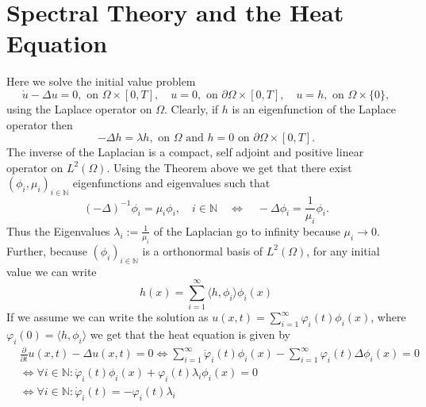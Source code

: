 \documentclass[A4,12pt,twoside]{book}
\begin{document}
\section{Spectral Theory and the Heat Equation}
Here we solve the initial value problem 
\[
\dot{u} - \Delta u =0, \text{ on } \Omega \times [0,T], \quad u=0, \text{ on } \partial \Omega \times [0,T], \quad u=h, \text{ on } \Omega \times \{0\},
\]
using the Laplace operator on $\Omega$. Clearly, if $h$ is an eigenfunction of the Laplace operator then 
\[
- \Delta h= \lambda h, \text{ on } \Omega \text{ and } h=0 \text{ on } \partial \Omega \times [0,T].
\]
The inverse of the Laplacian is a compact, self adjoint and positive linear operator on $L^2 (\Omega)$. Using the Theorem above we get that there exist $(\phi_i,\mu_i)_{i \in \mathbb{N}}$ eigenfunctions and eigenvalues such that 
\[
(-\Delta )^{-1} \phi_i = \mu_i \phi_i, \quad i \in \mathbb{N} \quad \iff \quad -\Delta \phi_i = \frac{1}{\mu_i} \phi_i.
\]
Thus the Eigenvalues $\lambda_i := \frac{1}{\mu_i}$ of the Laplacian go to infinity because $\mu_i \to 0$.\\
Further, because $(\phi_i)_{i \in \mathbb{N}}$ is a orthonormal basis of $L^2 (\Omega)$, for any initial value we can write 
\[
h(x) = \sum_{i=1}^\infty \langle h,\phi_i\rangle \phi_i (x)
\]
If we assume we can write the solution as $u(x,t) = \sum_{i=1}^\infty \varphi_i (t) \phi_i (x)$, where $\varphi_i (0)=\langle h,\phi_i\rangle$ we get that the heat equation is given by 
\begin{align*}
&\frac{\partial}{\partial t}  u(x,t)  - \Delta u(x,t) =0 \iff   \sum_{i=1}^\infty \dot{\varphi}_i(t) \phi_i (x) -  \sum_{i=1}^\infty \varphi_i (t) \Delta \phi_i (x) =0 \\
&\iff \forall i \in \mathbb{N}: \dot{\varphi}_i(t)  \phi_i (x) +\varphi_i (t) \lambda_i  \phi_i (x)  =0 \\
&\iff \forall i \in \mathbb{N}: \dot{\varphi}_i(t) = -\varphi_i (t) \lambda_i 
\end{align*}
\end{document}

